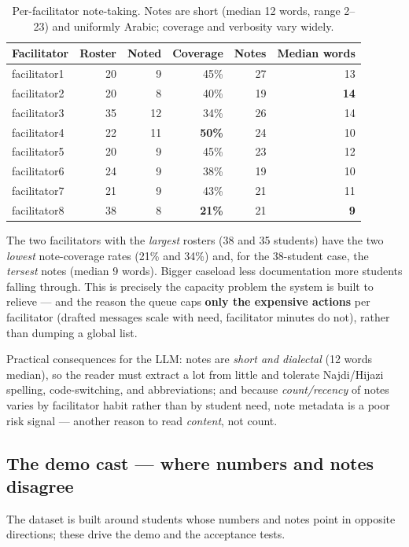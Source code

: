 \documentclass[11pt,paper=a4,parskip=half,DIV=11]{scrartcl}
\begin{document}
\begin{table}[h]\centering\footnotesize
\caption{Per-facilitator note-taking. Notes are short (median 12 words, range 2--23) and uniformly
Arabic; coverage and verbosity vary widely.}
\begin{tabular}{lrrrrr}
\toprule
Facilitator & Roster & Noted & Coverage & Notes & Median words \\
\midrule
facilitator1 & 20 & 9 & 45\% & 27 & 13 \\
facilitator2 & 20 & 8 & 40\% & 19 & \textbf{14} \\
facilitator3 & 35 & 12 & 34\% & 26 & 14 \\
facilitator4 & 22 & 11 & \textbf{50\%} & 24 & 10 \\
facilitator5 & 20 & 9 & 45\% & 23 & 12 \\
facilitator6 & 24 & 9 & 38\% & 19 & 10 \\
facilitator7 & 21 & 9 & 43\% & 21 & 11 \\
facilitator8 & 38 & 8 & \textbf{21\%} & 21 & \textbf{9} \\
\bottomrule
\end{tabular}
\end{table}

\begin{insight}
The two facilitators with the \emph{largest} rosters (38 and 35 students) have the two \emph{lowest}
note-coverage rates (21\% and 34\%) and, for the 38-student case, the \emph{tersest} notes (median 9
words). Bigger caseload \textrightarrow{} less documentation \textrightarrow{} more students falling through.
This is precisely the capacity problem the system is built to relieve --- and the reason the queue caps
\textbf{only the expensive actions} per facilitator (drafted messages scale with need, facilitator
minutes do not), rather than dumping a global list.
\end{insight}

Practical consequences for the LLM: notes are \emph{short and dialectal} (12 words median), so the
reader must extract a lot from little and tolerate Najdi/Hijazi spelling, code-switching, and
abbreviations; and because \emph{count/recency} of notes varies by facilitator habit rather than by
student need, note metadata is a poor risk signal --- another reason to read \emph{content}, not count.

\subsection{The demo cast --- where numbers and notes disagree}
The dataset is built around students whose numbers and notes point in opposite directions; these drive
the demo and the acceptance tests.
\end{document}
